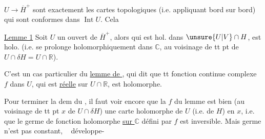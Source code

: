 $U\longrightarrow\overline H^+$ sont exactement les cartes topologiques
(i.e. 
appliquant bord sur bord) qui sont conformes dans $\operatorname{Int}U$.
Cela 

\uline{Lemme 1} Soit $U$ un ouvert de $\overline H^+$, alors 
 qui est hol.
dans $\unsure{U|V}\cap H$, est holo. (i.e. se prolonge holomorphiquement
dans $\mathbb C$, au voisinage de tt
pt de $U\cap\delta H=U\cap\mathbb R$).

C'est un cas particulier du \uline{lemme de
}, qui dit que tt fonction 
continue complexe $f$ dans $U$, qui est
\uline{réelle} sur $U\cap\mathbb R$, est holomorphe.

Pour terminer la dem du , il faut
voir encore que la $f$ du lemme est bien
(au voisinage de tt pt $x$ de $U\cap\delta H$) une
carte holomorphe de  $U$ (i.e. de $H$) en $x$,
i.e. que le germe  de fonction holomorphe
\uline{sur $\mathbb C$} défini par $f$ est inversible. Mais 
germe n'est pas constant, \  développe-
